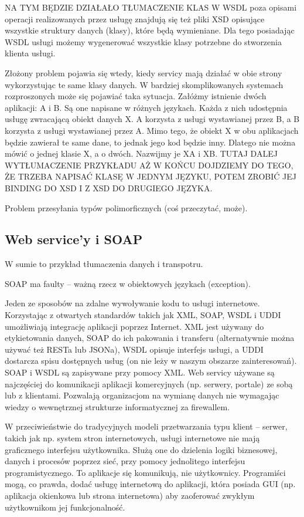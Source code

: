 NA TYM BĘDZIE DZIAŁAŁO TŁUMACZENIE KLAS
W WSDL poza opisami operacji realizowanych przez usługę znajdują się też pliki XSD opisujące wszystkie struktury danych (klasy), które będą wymieniane. Dla tego posiadając WSDL usługi możemy wygenerować wszystkie klasy potrzebne do stworzenia klienta usługi.

Złożony problem pojawia się wtedy, kiedy servicy mają działać w obie strony wykorzystując te same klasy danych. W bardziej skomplikowanych systemach rozproszonych może się pojawiać taka sytuacja. Załóżmy istnienie dwóch aplikacji: A i B. Są one napisane w różnych językach. Każda z nich udostępnia usługę zwracającą obiekt danych X. A korzysta z usługi wystawianej przez B, a B korzysta z usługi wystawianej przez A. Mimo tego, że obiekt X w obu aplikacjach będzie zawierał te same dane, to jednak jego kod będzie inny. Dlatego nie można mówić o jednej klasie X, a o dwóch. Nazwijmy je XA i XB. TUTAJ DALEJ WYTŁUMACZENIE PRZYKŁADU AŻ W KOŃCU DOJDZIEMY DO TEGO, ŻE TRZEBA NAPISAĆ KLASĘ W JEDNYM JĘZYKU, POTEM ZROBIĆ JEJ BINDING DO XSD I Z XSD DO DRUGIEGO JĘZYKA.

Problem przesyłania typów polimorficznych (coś przeczytać, może). 

\subsection{Web service'y i SOAP}
W sumie to przykład tłumaczenia danych  i transpotru.

SOAP ma faulty -- ważną rzecz w obiektowych językach (exception).

Jeden ze sposobów na zdalne wywoływanie kodu to usługi internetowe. Korzystając z otwartych standardów takich jak XML, SOAP, WSDL i UDDI umożliwiają integrację aplikacji poprzez Internet. XML jest używany do etykietowania danych, SOAP do ich pakowania i transferu (alternatywnie można używać też RESTa lub JSONa), WSDL opisuje interfejs usługi, a UDDI dostarcza spisu dostępnych usług (on nie leży w naszym obszarze zainteresowań). SOAP i WSDL są zapisywane przy pomocy XML. Web servicy używane są najczęściej do komunikacji aplikacji komercyjnych (np. serwery, portale) ze sobą lub z klientami. Pozwalają organizacjom na wymianę danych nie wymagając wiedzy o wewnętrznej strukturze informatycznej za firewallem.

W przeciwieństwie do tradycyjnych modeli przetwarzania typu klient – serwer, takich jak np. system stron internetowych, usługi internetowe nie mają graficznego interfejsu użytkownika. Służą one do dzielenia logiki biznesowej, danych i procesów poprzez sieć, przy pomocy jednolitego interfejsu programistycznego. To aplikacje się komunikują, nie użytkownicy. Programiści mogą, co prawda, dodać usługę internetową do aplikacji, która posiada GUI (np. aplikacja okienkowa lub strona internetowa) aby zaoferować zwykłym użytkownikom jej funkcjonalność.


